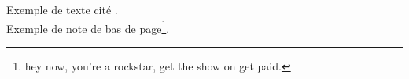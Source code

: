 Exemple de texte cité \cite{Hambley}.\\
Exemple de note de bas de page\footnote[1]{hey now, you're a rockstar, get the show on get paid.}.
